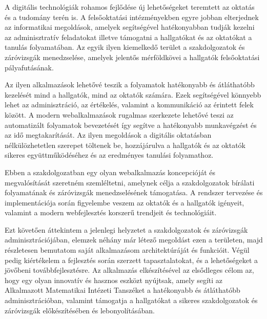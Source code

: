
A digitális technológiák rohamos fejlődése új lehetőségeket teremtett az oktatás és a tudomány terén is. A felsőoktatási intézményekben egyre jobban elterjednek az informatikai megoldások, amelyek segítségével hatékonyabban tudják kezelni az adminisztratív feladatokat illetve támogatni a hallgatókat és az oktatókat a tanulás folyamatában. Az egyik ilyen kiemelkedő terület a szakdolgozatok és záróvizsgák menedzselése, amelyek jelentős mérföldkövei a hallgatók felsőoktatási pályafutásának.

Az ilyen alkalmazások lehetővé teszik a folyamatok hatékonyabb és átláthatóbb kezelését mind a hallgatók, mind az oktatók számára. Ezek segítségével könnyebb lehet az adminisztráció, az értékelés, valamint a kommunikáció az érintett felek között. A modern webalkalmazások rugalmas szerkezete lehetővé teszi az automatizált folyamatok bevezetését így segítve a hatékonyabb munkavégzést és az idő megtakarítását. Az ilyen megoldások a digitális oktatásban nélkülözhetetlen szerepet töltenek be, hozzájárulva a hallgatók és az oktatók sikeres együttműködéséhez és az eredményes tanulási folyamathoz.

Ebben a szakdolgozatban egy olyan webalkalmazás koncepcióját és megvalósítását szeretném szemléltetni, amelynek célja a szakdolgozatok bírálati folyamatának és záróvizsgák menedzselésének támogatása. A rendszer tervezése és implementációja során figyelembe veszem az oktatók és a hallgatók igényeit, valamint a modern webfejlesztés korszerű trendjeit és technológiáit.

Ezt követően áttekintem a jelenlegi helyzetet a szakdolgozatok és záróvizsgák adminisztrációjában, elemzek néhány már létező megoldást ezen a területen, majd részletesen bemutatom saját alkalmazásom architektúráját és funkcióit. Végül pedig kiértékelem a fejlesztés során szerzett tapasztalatokat, és a lehetőségeket a jövőbeni továbbfejlesztésre. Az alkalmazás elkészítésével az elsődleges célom az, hogy egy olyan innovatív és hasznos eszközt nyújtsak, amely segíti az Alkalmazott Matematikai Intézeti Tanszéket a hatékonyabb és átláthatóbb adminisztrációban, valamint támogatja a hallgatókat a sikeres szakdolgozatok és záróvizsgák előkészítésében és lebonyolításában.